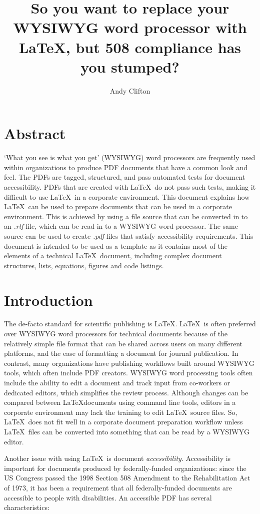 \documentclass[12pt,letterpaper]{article}
\author{Andy Clifton}
\title{So you want to replace your WYSIWYG word processor with LaTeX, but 508 compliance has you stumped?}
\newcommand{\fn}[1]{\emph{#1}}
\begin{document}
\section*{Abstract}
`What you see is what you get' (WYSIWYG) word processors are frequently used within organizations to produce PDF documents that have a common look and feel. The PDFs are tagged, structured, and pass automated tests for document accessibility. PDFs that are created with \LaTeX\ do not pass such tests, making it difficult to use \LaTeX\ in a corporate environment. This document explains how \LaTeX\ can be used to prepare documents that can be used in a corporate environment. This is achieved by using a file source that can be converted in to an \fn{.rtf} file, which can be read in to a WYSIWYG word processor. The same source can be used to create \fn{.pdf} files that satisfy accessibility requirements. This document is intended to be used as a template as it contains most of the elements of a technical \LaTeX\ document, including complex document structures, lists, equations, figures and code listings.

\tableofcontents
\listoffigures
\listoftables

\section{Introduction}
The de-facto standard for scientific publishing is \LaTeX. \LaTeX\ is often preferred over WYSIWYG word processors for technical documents because of the relatively simple file format that can be shared across users on many different platforms, and the ease of formatting a document for journal publication. In contrast, many organizations have publishing workflows built around WYSIWYG tools, which often include PDF creators. WYSIWYG word processing tools often include the ability to edit a document and track input from co-workers or dedicated editors, which simplifies the review process. Although changes can be compared between \LaTeX documents using command line tools, editors in a corporate environment may lack the training to edit \LaTeX\ source files. So, \LaTeX\ does not fit well in a corporate document preparation workflow unless \LaTeX\ files can be converted into something that can be read by a WYSIWYG editor.

Another issue with using \LaTeX\, is document \emph{accessibility}. Accessibility is important for documents produced by federally-funded organizations: since the US Congress passed the 1998 Section 508 Amendment to the Rehabilitation Act of 1973, it has been a requirement that all federally-funded documents are accessible to people with disabilities. An accessible PDF has several characteristics:
\end{document}
